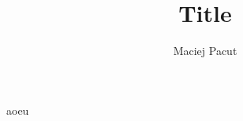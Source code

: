 \documentclass[a4paper]{article}
\title{Title}
\author{Maciej Pacut}
\begin{document}
\maketitle

aoeu
\end{document}
